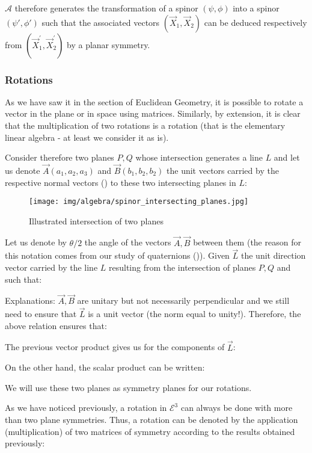 	$\mathcal{A}$ therefore generates the transformation of a spinor $(\psi,\phi)$ into a spinor $(\psi',\phi')$ such that the associated vectors $(\vec{X}_1,\vec{X}_2)$ can be deduced respectively from $(\vec{X}_1^{'},\vec{X}_2^{'})$  by a planar symmetry.
	
	\subsubsection{Rotations}
	As we have saw it in the section of Euclidean Geometry, it is possible to rotate a vector in the plane or in space using matrices. Similarly, by extension, it is clear that the multiplication of two rotations is a rotation (that is the elementary linear algebra - at least we consider it as is).
	
	Consider therefore two planes $P, Q$ whose intersection generates a line $L$ and let us denote $\vec{A}(a_1,a_2,a_3)$ and $\vec{B}(b_1,b_2,b_2)$ the unit vectors carried by the respective normal vectors () to these two intersecting planes in $L$:
	\begin{figure}[H]
		\centering
		\texttt{[image: img/algebra/spinor\_intersecting\_planes.jpg]}
		\caption[]{Illustrated intersection of two planes}
	\end{figure}
	Let us denote by $\theta/2$ the angle of the vectors $\vec{A},\vec{B}$ between them (the reason for this notation comes from our study of quaternions ()). Given $\vec{L}$ the unit direction vector carried by the line $L$ resulting from the intersection of planes $P, Q$ and such that:
	
	Explanations: $\vec{A},\vec{B}$ are unitary but not necessarily perpendicular and we still need to ensure that $\vec{L}$ is a unit vector (the norm equal to unity!). Therefore, the above relation ensures that:
	
	The previous vector product gives us for the components of $\vec{L}$:
	
	On the other hand, the scalar product can be written:	
	
	\begin{tcolorbox}[title=Remark,colframe=black,arc=10pt]
	We will use these two planes as symmetry planes for our rotations.
	\end{tcolorbox}	
	As we have noticed previously, a rotation in $\mathcal{E}^3$ can always be done with more than two plane symmetries. Thus, a rotation can be denoted by the application (multiplication) of two matrices of symmetry according to the results obtained previously:
	
